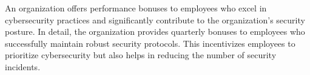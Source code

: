 An organization offers performance bonuses to employees who excel in cybersecurity practices and significantly contribute to the organization's security posture. In detail, the organization provides quarterly bonuses to employees who successfully maintain robust security protocols. This incentivizes employees to prioritize cybersecurity but also helps in reducing the number of security incidents.